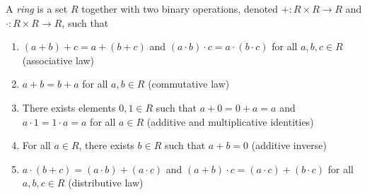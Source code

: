   \begin{definition} \label{ring} %
    A \emph{ring} is a set $R$ together with two binary operations, denoted $+: R \times R \longrightarrow R$ and $\cdot: R \times R \longrightarrow R$, such that
    \begin{enumerate}
      \item $(a+b)+c = a+(b+c)$ and $(a \cdot b) \cdot c = a \cdot (b \cdot c)$ for all $a,b,c \in R$ (associative law)
      \item $a+b = b+a$ for all $a,b \in R$ (commutative law)
      \item There exists elements $0,1 \in R$ such that $a+0 = 0 + a = a $ and $a\cdot1 = 1 \cdot a = a $ for all $a \in R$ (additive and multiplicative identities)
      \item For all $a \in R$, there exists $b \in R$ such that $a+b = 0$ (additive inverse)
      \item $a\cdot(b+c) = (a \cdot b) + (a \cdot c)$ and $(a+b) \cdot c = (a \cdot c) + (b \cdot c)$ for all $a,b,c \in R$ (distributive law)
    \end{enumerate}
  \end{definition}